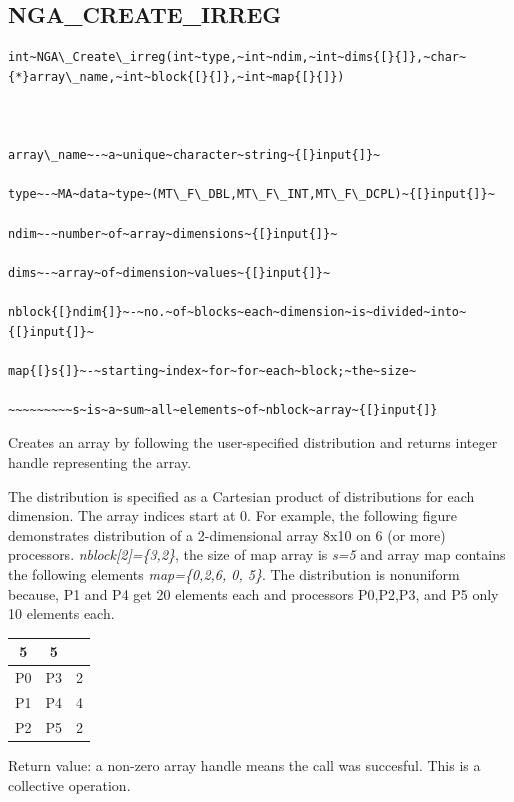 \subsection*{\label{sub:NGA_CREATE_IRREG}NGA\_CREATE\_IRREG}
\begin{verbatim}
int~NGA\_Create\_irreg(int~type,~int~ndim,~int~dims{[}{]},~char~{*}array\_name,~int~block{[}{]},~int~map{[}{]})



array\_name~-~a~unique~character~string~{[}input{]}~

type~-~MA~data~type~(MT\_F\_DBL,MT\_F\_INT,MT\_F\_DCPL)~{[}input{]}~

ndim~-~number~of~array~dimensions~{[}input{]}~

dims~-~array~of~dimension~values~{[}input{]}~

nblock{[}ndim{]}~-~no.~of~blocks~each~dimension~is~divided~into~{[}input{]}~

map{[}s{]}~-~starting~index~for~for~each~block;~the~size~

~~~~~~~~~s~is~a~sum~all~elements~of~nblock~array~{[}input{]}
\end{verbatim}
Creates an array by following the user-specified distribution and
returns integer handle representing the array.

The distribution is specified as a Cartesian product of distributions
for each dimension. The array indices start at 0. For example, the
following figure demonstrates distribution of a 2-dimensional array
8x10 on 6 (or more) processors. \emph{nblock{[}2{]}=\{3,2\}}, the
size of map array is \emph{s=5} and array map contains the following
elements \emph{map=\{0,2,6, 0, 5\}}. The distribution is nonuniform
because, P1 and P4 get 20 elements each and processors P0,P2,P3, and
P5 only 10 elements each. 

\begin{tabular}{|c|c|c|}
\cline{1-2} 
5 & 5 & \multicolumn{1}{c}{}\tabularnewline
\hline 
P0 & P3 & 2\tabularnewline
\hline 
P1 & P4 & 4\tabularnewline
\hline 
P2 & P5 & 2\tabularnewline
\hline
\end{tabular}

Return value: a non-zero array handle means the call was succesful.
This is a collective operation.


